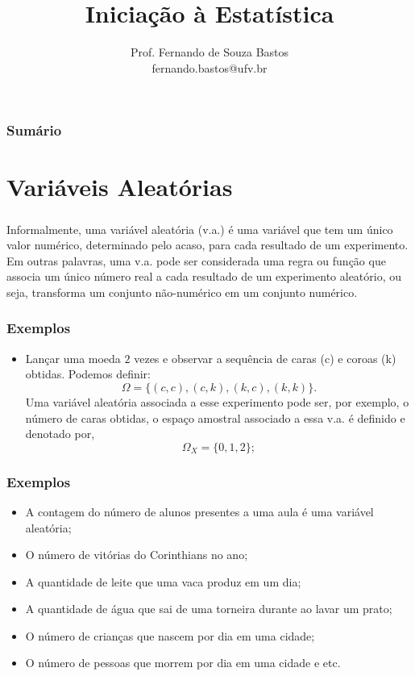 \documentclass[14pt,aspectratio=1610]{beamer}
\title{Iniciação à Estatística}
\author{Prof. Fernando de Souza Bastos \texorpdfstring{\\ fernando.bastos@ufv.br}{}}
\institute{Departamento de Estatística \texorpdfstring{\\ Universidade Federal de Viçosa}{}\texorpdfstring{\\ Campus UFV - Viçosa}{}}
\date{}
\begin{document}
%

\frame{\titlepage}

\begin{frame}{}
\frametitle{\bf Sumário}
\tableofcontents
\end{frame}

\section{Variáveis Aleatórias}
\begin{frame}{}
\frametitle{}
\begin{block}{}
\justifying
Informalmente, uma variável aleatória (v.a.) é uma variável que tem um único valor numérico, determinado pelo acaso, para cada resultado de um experimento. Em outras palavras, uma v.a. pode ser considerada uma regra ou função que associa um único número real a cada resultado de um experimento aleatório, ou seja, transforma um conjunto não-numérico em um conjunto numérico.
\end{block}
\end{frame}

\begin{frame}{}
\frametitle{Exemplos}
\begin{block}{}
\justifying
\begin{itemize}
\item Lançar uma moeda $2$ vezes e observar a sequência de caras (c) e coroas (k) obtidas. Podemos definir: $$\Omega=\{(c,c),(c,k),(k,c),(k,k)\}.$$ Uma variável aleatória associada a esse experimento pode ser, por exem\-plo, o número de caras obtidas, o espaço amostral associado a essa v.a. é definido e denotado por, $$\Omega_{X}=\{0,1,2\};$$
\end{itemize}
\end{block}
\end{frame}

\begin{frame}{}
\frametitle{Exemplos}
\begin{block}{}
\justifying
\begin{itemize}
\item A contagem do número de alunos presentes a uma aula é uma variável aleatória;\pause
\item O número de vitórias do Corinthians no ano;\pause
\item A quantidade de leite que uma vaca produz em um dia;\pause
\item A quantidade de água que sai de uma torneira durante ao lavar um prato;\pause
\item O número de crianças que nascem por dia em uma cidade;\pause
\item O número de pessoas que morrem por dia em uma cidade e etc.
\end{itemize}
\end{block}
\end{frame}
\end{document}
